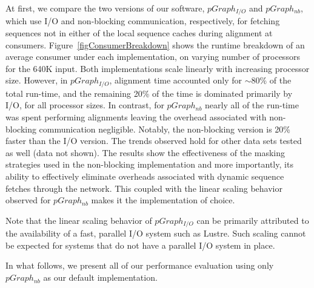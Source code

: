 \documentclass[10pt,journal,letterpaper,compsoc]{IEEEtran}
\begin{document}
At first, we compare the two versions of our software, $pGraph_{I/O}$ and $pGraph_{nb}$, which  use I/O and non-blocking communication, respectively, for fetching sequences not in either of the local sequence caches during alignment at consumers. Figure~\ref{figConsumerBreakdown} shows the runtime breakdown of an average consumer under each implementation, on varying number of processors for the 640K input. Both implementations scale linearly with increasing processor size. However, in $pGraph_{I/O}$, alignment time accounted only for $\sim 80$\% of the total run-time, and the remaining 20\% of the time is dominated primarily by I/O, for all processor sizes. In contrast, for $pGraph_{nb}$ nearly all of the run-time was spent performing alignments leaving the overhead associated with non-blocking communication negligible. Notably, the non-blocking version is 20\% faster than the I/O version. The trends observed hold for other data sets tested as well (data not shown). The results show the effectiveness of the masking strategies used in the non-blocking implementation and more importantly, its ability to effectively eliminate overheads associated with dynamic sequence fetches through the network. This coupled with the linear scaling behavior observed for $pGraph_{nb}$ makes it the implementation of choice.

Note that the linear scaling behavior of  $pGraph_{I/O}$ can be primarily attributed to the availability of a fast, parallel I/O system such as Lustre. Such scaling cannot be expected for systems that do not have a parallel I/O system in place.

In what follows, we present all of our performance evaluation using only $pGraph_{nb}$ as our default implementation.
\end{document}

